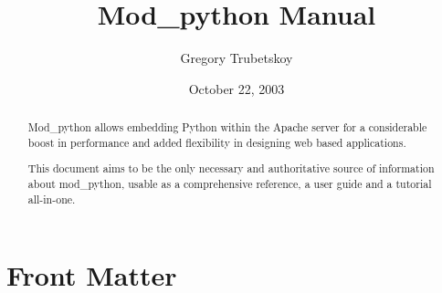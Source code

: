 \documentclass{manual}
\title{Mod\_python Manual}
\author{Gregory Trubetskoy}
\date{October 22, 2003}
\begin{document}
\maketitle

\ifhtml
\chapter*{Front Matter\label{front}}
\fi



\begin{abstract}

\noindent
Mod_python allows embedding Python within the Apache server for a considerable
boost in performance and added flexibility in designing web based
applications.

This document aims to be the only necessary and authoritative source of
information about mod_python, usable as a comprehensive reference, a user guide
and a tutorial all-in-one.

\begin{seealso}
\end{seealso}

\end{abstract}

\tableofcontents

\appendix


\end{document}
